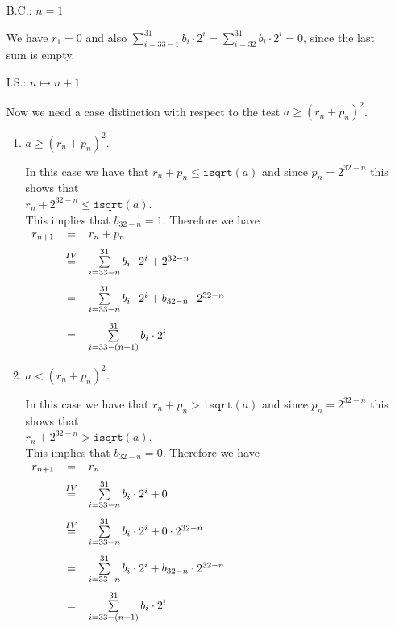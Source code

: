 \begin{enumerate}
\item[B.C.:] $n = 1$

  We have $r_1 = 0$ and also $\sum\limits_{i=33-1}^{31} b_i \cdot 2^i = \sum\limits_{i=32}^{31} b_i \cdot 2^i =  0$,
  since the last sum is empty.
\item[I.S.:] $n \mapsto n+1$

  Now we need a case distinction with respect to the test $a \geq (r_n + p_n)^2$.
  \begin{enumerate}
  \item $a \geq (r_n + p_n)^2$.

    In this case we have that $r_n + p_n \leq \mathtt{isqrt}(a)$ and since $p_n = 2^{32-n}$ this shows that
    \\[0.2cm]
    \hspace*{1.3cm}
    $r_n + 2^{32-n} \leq \mathtt{isqrt}(a)$.
    \\[0.2cm]
    This implies that $b_{32-n} = 1$.  Therefore we have
    \\[0.2cm]
    \hspace*{1.3cm}
    $
    \begin{array}[t]{lcl}
      r_{n+1} & = & r_n + p_n \\[0.2cm] 
              & \stackrel{IV}{=} & \sum\limits_{i=33-n}^{31} b_i \cdot 2^i + 2^{32-n} \\[0.5cm]
              & = & \sum\limits_{i=33-n}^{31} b_i \cdot 2^i + b_{32-n} \cdot 2^{32-n} \\[0.5cm]
              & = & \sum\limits_{i=33-(n+1)}^{31} b_i \cdot 2^i 
    \end{array}
    $
  \item $a < (r_n + p_n)^2$. 

    In this case we have that $r_n + p_n > \mathtt{isqrt}(a)$ and since $p_n = 2^{32-n}$ this shows that
    \\[0.2cm]
    \hspace*{1.3cm}
    $r_n + 2^{32-n} > \mathtt{isqrt}(a)$.
    \\[0.2cm]
    This implies that $b_{32-n} = 0$.  Therefore we have
    \\[0.2cm]
    \hspace*{1.3cm}
    $
    \begin{array}[t]{lcl}
      r_{n+1} & = & r_n  \\[0.2cm] 
              & \stackrel{IV}{=} & \sum\limits_{i=33-n}^{31} b_i \cdot 2^i + 0 \\[0.5cm]
              & \stackrel{IV}{=} & \sum\limits_{i=33-n}^{31} b_i \cdot 2^i + 0 \cdot 2^{32-n} \\[0.5cm]
              & = & \sum\limits_{i=33-n}^{31} b_i \cdot 2^i + b_{32-n} \cdot 2^{32-n} \\[0.5cm]
              & = & \sum\limits_{i=33-(n+1)}^{31} b_i \cdot 2^i 
    \end{array}
    $
  \end{enumerate}
\end{enumerate}
